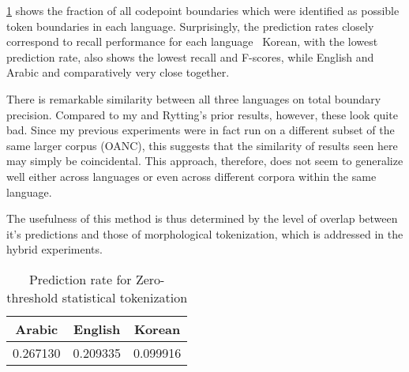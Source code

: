 \ref{zpredtable} shows the fraction of all codepoint boundaries which were identified as possible token boundaries in each language. Surprisingly, the prediction rates closely correspond to recall performance for each language\textemdash~ Korean, with the lowest prediction rate, also shows the lowest recall and F-scores, while English and Arabic and comparatively very close together.

There is remarkable similarity between all three languages on total boundary precision. Compared to my \cite{kearsley14} and Rytting's \cite{rytting04} prior results, however, these look quite bad. Since my previous experiments were in fact run on a different subset of the same larger corpus (OANC), this suggests that the similarity of results seen here may simply be coincidental. This approach, therefore, does not seem to generalize well either across languages or even across different corpora within the same language.

The usefulness of this method is thus determined by the level of overlap between it's predictions and those of morphological tokenization, which is addressed in the hybrid experiments.

\begin{table}
	\centering
	\begin{tabular}{| c | c | c |}
		\hline
		Arabic & English & Korean \\ \hline
		0.267130 & 0.209335 & 0.099916 \\ \hline
	\end{tabular}
	\caption{Prediction rate for Zero-threshold statistical tokenization}
	\label{zpredtable}
\end{table}

